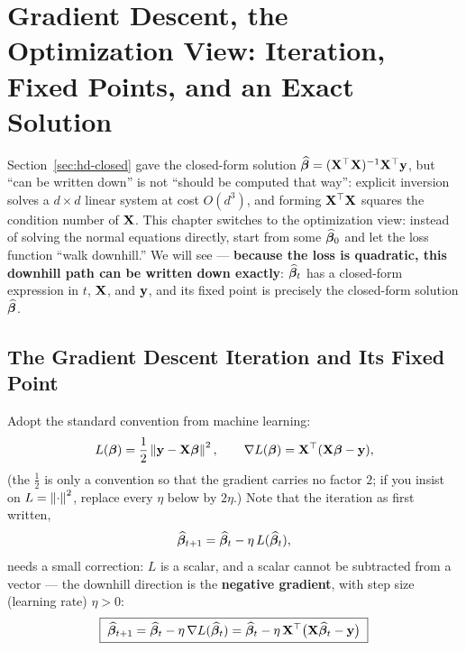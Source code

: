 \section[Gradient descent: iteration and exact solutions]{Gradient Descent, the Optimization View: Iteration, Fixed Points, and an Exact Solution}\label{sec:gd}

Section~\ref{sec:hd-closed} gave the closed-form solution $\widehat{\bm{\beta}} = (\mathbf{X}^\top\mathbf{X})^{-1}\mathbf{X}^\top\mathbf{y}$, but ``can be written down'' is not ``should be computed that way'': explicit inversion solves a $d \times d$ linear system at cost $O(d^3)$, and forming $\mathbf{X}^\top\mathbf{X}$ squares the condition number of $\mathbf{X}$. This chapter switches to the optimization view: instead of solving the normal equations directly, start from some $\widehat{\bm{\beta}}_0$ and let the loss function ``walk downhill.'' We will see — \textbf{because the loss is quadratic, this downhill path can be written down exactly}: $\widehat{\bm{\beta}}_t$ has a closed-form expression in $t$, $\mathbf{X}$, and $\mathbf{y}$, and its fixed point is precisely the closed-form solution $\widehat{\bm{\beta}}$.

\subsection{The Gradient Descent Iteration and Its Fixed Point}\label{sec:gd-iter}

Adopt the standard convention from machine learning:
\begin{equation}\label{eq:gd-loss}
  L(\bm{\beta}) = \frac{1}{2}\left\lVert \mathbf{y} - \mathbf{X} \bm{\beta} \right\rVert^2,
  \qquad
  \nabla L(\bm{\beta}) = \mathbf{X}^\top (\mathbf{X} \bm{\beta} - \mathbf{y}),
\end{equation}
(the $\frac12$ is only a convention so that the gradient carries no factor $2$; if you insist on $L = \left\lVert \cdot \right\rVert^2$, replace every $\eta$ below by $2\eta$.) Note that the iteration as first written,
\[
  \widehat{\bm{\beta}}_{t+1} = \widehat{\bm{\beta}}_t - \eta\, L(\widehat{\bm{\beta}}_t),
\]
needs a small correction: $L$ is a scalar, and a scalar cannot be subtracted from a vector — the downhill direction is the \textbf{negative gradient}, with step size (learning rate) $\eta > 0$:
\begin{equation}\label{eq:gd}
  \boxed{\;\widehat{\bm{\beta}}_{t+1} = \widehat{\bm{\beta}}_t - \eta\, \nabla L(\widehat{\bm{\beta}}_t)
       = \widehat{\bm{\beta}}_t - \eta\, \mathbf{X}^\top \big( \mathbf{X} \widehat{\bm{\beta}}_t - \mathbf{y} \big)\;}
\end{equation}

